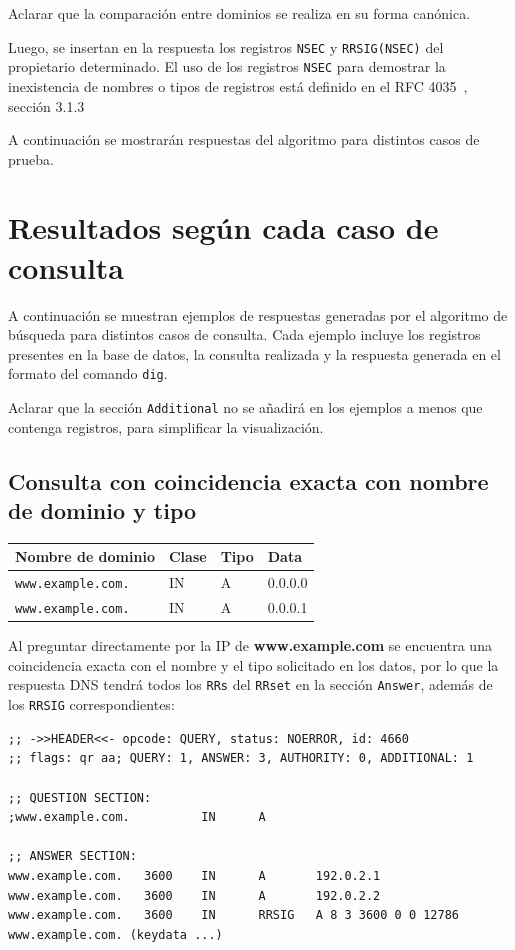 Aclarar que la comparación entre dominios se realiza en su forma canónica.

Luego, se insertan en la respuesta los registros \texttt{NSEC} y \texttt{RRSIG(NSEC)} del propietario determinado. El uso de los registros \texttt{NSEC} para demostrar la 
inexistencia de nombres o tipos de registros está definido en el RFC 4035~\cite{RFC4035}, sección 3.1.3

A continuación se mostrarán respuestas del algoritmo para distintos casos de prueba.

\section{Resultados según cada caso de consulta}

A continuación se muestran ejemplos de respuestas generadas por el algoritmo de búsqueda para distintos casos de consulta. Cada ejemplo incluye los registros presentes en la base de datos, 
la consulta realizada y la respuesta generada en el formato del comando \texttt{dig}.

Aclarar que la sección \texttt{Additional} no se añadirá en los ejemplos a menos que contenga registros, para simplificar la visualización.

\subsection{Consulta con coincidencia exacta con nombre de dominio y tipo}

\begin{table}[h!]
\centering
\begin{tabular}{llll}
\textbf{Nombre de dominio} & \textbf{Clase} & \textbf{Tipo} & \textbf{Data} \\
\hline
\texttt{www.example.com.} & IN & A & 0.0.0.0 \\
\texttt{www.example.com.} & IN & A & 0.0.0.1 \\
\end{tabular}
\end{table}

Al preguntar directamente por la IP de \textbf{www.example.com} se encuentra una coincidencia exacta con el nombre y el tipo solicitado en los datos, por lo que la 
respuesta DNS tendrá todos los \texttt{RRs} del \texttt{RRset} en la sección \texttt{Answer}, además de los \texttt{RRSIG} correspondientes:\\

\begin{lstlisting}
;; ->>HEADER<<- opcode: QUERY, status: NOERROR, id: 4660
;; flags: qr aa; QUERY: 1, ANSWER: 3, AUTHORITY: 0, ADDITIONAL: 1

;; QUESTION SECTION:
;www.example.com.          IN      A

;; ANSWER SECTION:
www.example.com.   3600    IN      A       192.0.2.1
www.example.com.   3600    IN      A       192.0.2.2
www.example.com.   3600    IN      RRSIG   A 8 3 3600 0 0 12786 www.example.com. (keydata ...)
\end{lstlisting}

